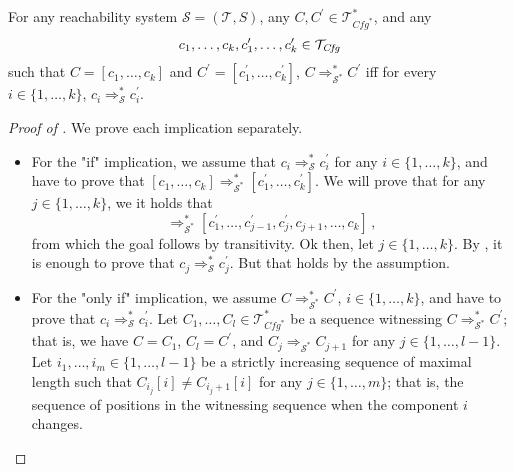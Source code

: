 \begin{lemma}\label{lem:reachComposite}
    For any reachability system $\mathcal{S} = (\mathcal{T}, S)$, any $C,C^\prime \in \mathcal{T}^*_{\mathit{Cfg}^*}$,
    and any
    \begin{equation*}
        c_1,\ldots,c_k,c_1^\prime,\ldots,c_k^\prime \in \mathcal{T}_{\mathit{Cfg}}
    \end{equation*}
    such that
    $C = [c_1,\ldots,c_k]$ and $C^\prime = [c_1^\prime,\ldots,c_k^\prime]$,
    $C \Rightarrow^*_{\mathcal{S}^*} C^\prime$ iff for every $i \in \{ 1, \ldots, k \}$,
    $c_i \Rightarrow^*_{\mathcal{S}} c_i^\prime$.
\end{lemma}
\begin{proof}[Proof of ]
We prove each implication separately.
\begin{itemize}
    \item For the "if" implication, we assume that $c_i \Rightarrow_{\mathcal{S}}^* c_i^\prime$
          for any $i \in \{ 1, \ldots, k \}$,
          and have to prove that $[c_1,\ldots,c_k] \Rightarrow_{\mathcal{S}^*}^* [c_1^\prime,\ldots,c_k^\prime]$.
          We will prove that for any $j \in \{ 1, \ldots, k \}$, we it holds that
          \begin{equation*}
           [c^\prime_1,\ldots,c^\prime_{j-1}, c_j, c_{j+1}, \ldots, c_k] \Rightarrow_{\mathcal{S}^*}^* [c^\prime_1,\ldots,c^\prime_{j-1}, c_j^\prime, c_{j+1}, \ldots, c_k]    \, ,
          \end{equation*}
          from which the goal follows by transitivity.
          Ok then, let $j \in \{ 1, \ldots, k \}$.
          By , it is enough to prove that $c_j \Rightarrow^*_{\mathcal{S}} c_j^\prime$.
          But that holds by the assumption.
    \item For the "only if" implication, we assume $C \Rightarrow^*_{\mathcal{S}^*} C^\prime$,
          $i \in \{ 1,\ldots,k \}$, and have to prove that $c_i \Rightarrow^*_{\mathcal{S}} c_i^\prime$.
          Let $C_1,\ldots,C_l \in \mathcal{T}^*_{\mathit{Cfg}^*}$ be a sequence witnessing $C \Rightarrow^*_{\mathcal{S}^*} C^\prime$;
          that is, we have $C = C_1$, $C_l = C^\prime$, and $C_j \Rightarrow_{\mathcal{S}^*} C_{j+1}$ for any $j \in \{ 1, \ldots, l-1 \}$.
          Let $i_1,\ldots,i_m \in \{ 1,\ldots,l-1 \}$ be a strictly increasing sequence of maximal length such that
          $C_{i_j}[i] \not = C_{i_j + 1}[i]$ for any $j \in \{ 1,\ldots,m \}$;
          that is, the sequence of positions in the witnessing sequence when the component $i$ changes.

\end{itemize}
\end{proof}
